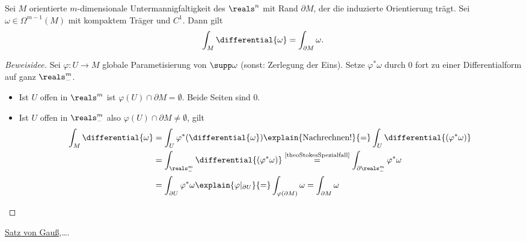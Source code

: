 \begin{satz} \label{theoStokes}
  Sei $M$ orientierte $m$-dimensionale Untermannigfaltigkeit des \( \reals^n \) mit Rand \( \partial M \), der die induzierte Orientierung trägt.
  Sei \( \omega\in\Omega^{m-1}(M) \) mit kompaktem Träger und $C^1$. Dann gilt 
  \begin{equation*}
      \int_M\differential{\omega}=\int_{\partial M}\omega.
  \end{equation*}
\end{satz}

\begin{proof}[Beweisidee]
  Sei \( \varphi\colon U\to M \) globale Parametisierung von \( \supp\omega \) (sonst: Zerlegung der Eins).
  Setze \( \varphi^*\omega \) durch 0 fort zu einer Differentialform auf ganz \( \reals_-^m \).
  \begin{itemize}
      \item Ist $U$ offen in \( \reals^m \) ist \( \varphi(U)\cap \partial M=\emptyset \). Beide Seiten sind 0.
      \item Ist $U$ offen in \( \reals_-^m \) also \( \varphi(U)\cap \partial M\neq\emptyset \), gilt 
      \begin{align*}
          \int_M\differential{\omega} &= \int_U\varphi^*(\differential{\omega})\explain{\text{Nachrechnen!}}{=}\int_U\differential{(\varphi^*\omega)}\\
          &= \int_{\reals_-^m}\differential{(\varphi^*\omega)} \overset{\text{\ref{theoStokesSpezialfall}}}{=}\int_{\partial\reals_-^m}\varphi^*\omega\\
          &= \int_{\partial U}\varphi^*\omega\explain{\varphi|_{\partial U}}{=}\int_{\varphi(\partial M)}\omega=\int_{\partial M}\omega
      \end{align*}
  \end{itemize}
\end{proof}

\begin{beispiel*}
  \hyperref[integralsatz_gauss]{Satz von Gauß},\dots.
\end{beispiel*}

